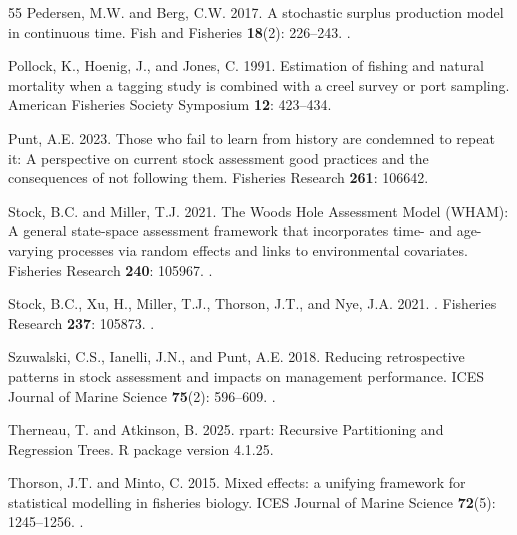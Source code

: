 \documentclass[
  12pt,
]{article}
\begin{document}
\begin{thebibliography}{55}
Pedersen, M.W. and Berg, C.W. 2017.
\newblock A stochastic surplus production model in continuous time.
\newblock Fish and Fisheries \textbf{18}(2): 226--243.
\newblock {}.

Pollock, K., Hoenig, J., and Jones, C. 1991.
\newblock Estimation of fishing and natural mortality when a tagging study is combined with a creel survey or port sampling.
\newblock American Fisheries Society Symposium \textbf{12}: 423--434.

Punt, A.E. 2023.
\newblock Those who fail to learn from history are condemned to repeat it: A perspective on current stock assessment good practices and the consequences of not following them.
\newblock Fisheries Research \textbf{261}: 106642.

Stock, B.C. and Miller, T.J. 2021.
\newblock The {W}oods {H}ole {A}ssessment {M}odel ({WHAM}): {A} general state-space assessment framework that incorporates time- and age-varying processes via random effects and links to environmental covariates.
\newblock Fisheries Research \textbf{240}: 105967.
\newblock {}.

Stock, B.C., Xu, H., Miller, T.J., Thorson, J.T., and Nye, J.A. 2021.
.
\newblock Fisheries Research \textbf{237}: 105873.
\newblock {}.

Szuwalski, C.S., Ianelli, J.N., and Punt, A.E. 2018.
\newblock Reducing retrospective patterns in stock assessment and impacts on management performance.
\newblock ICES Journal of Marine Science \textbf{75}(2): 596--609.
\newblock {}.

Therneau, T. and Atkinson, B. 2025.
\newblock rpart: {R}ecursive {P}artitioning and {R}egression {T}rees.
\newblock R package version 4.1.25.

Thorson, J.T. and Minto, C. 2015.
\newblock Mixed effects: a unifying framework for statistical modelling in fisheries biology.
\newblock ICES Journal of Marine Science \textbf{72}(5): 1245--1256.
\newblock {}.


\end{thebibliography}
\end{document}
